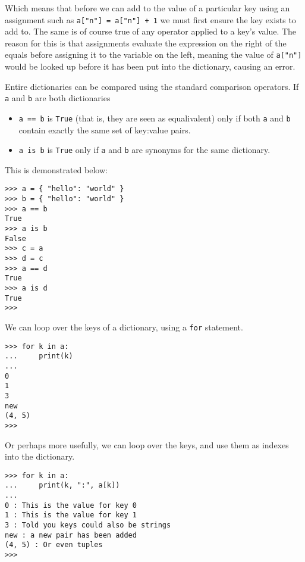 Which means that before we can add to the value of a particular key   using an assignment such as \texttt{a["n"] = a["n"] + 1} we   must first ensure the key exists to add to. The same is of course true   of any operator applied to a key's value. The reason for this is that   assignments evaluate the expression on the right of the equals before   assigning it to the variable on the left, meaning the value of \texttt{a["n"]}   would be looked up before it has been put into the dictionary, causing   an error.

Entire dictionaries can be compared using the standard comparison   operators. If \texttt{a} and \texttt{b} are both dictionaries
\begin{itemize}
	\item 
\texttt{a == b} is \texttt{True} (that is, they are seen as equalivalent) only if both    \texttt{a} and \texttt{b} contain exactly the same set of key:value pairs.
	\item 
\texttt{a is b} is \texttt{True} only if \texttt{a} and \texttt{b} are synonyms    for the same dictionary.
\end{itemize}

This is demonstrated below:
\begin{lstlisting}       
>>> a = { "hello": "world" }       
>>> b = { "hello": "world" }       
>>> a == b
True       
>>> a is b
False        
>>> c = a       
>>> d = c       
>>> a == d
True       
>>> a is d
True
>>>
\end{lstlisting}

We can loop over the keys of a dictionary, using a \texttt{for}   statement.
\begin{lstlisting}
>>> for k in a:
...     print(k)
... 
0
1
3
new
(4, 5)
>>>
\end{lstlisting}

Or perhaps more usefully, we can loop over the keys, and use them as   indexes into the dictionary.
\begin{lstlisting}
>>> for k in a:
...     print(k, ":", a[k])
... 
0 : This is the value for key 0
1 : This is the value for key 1
3 : Told you keys could also be strings
new : a new pair has been added
(4, 5) : Or even tuples
>>>
\end{lstlisting}


